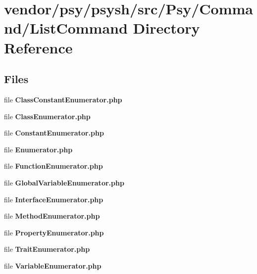 \section{vendor/psy/psysh/src/\+Psy/\+Command/\+List\+Command Directory Reference}
\label{dir_b2f54a0dbabbbaf2cba72a74f0d73e35}
\subsection*{Files}
\begin{DoxyCompactItemize}
\item 
file {\bf Class\+Constant\+Enumerator.\+php}
\item 
file {\bf Class\+Enumerator.\+php}
\item 
file {\bf Constant\+Enumerator.\+php}
\item 
file {\bf Enumerator.\+php}
\item 
file {\bf Function\+Enumerator.\+php}
\item 
file {\bf Global\+Variable\+Enumerator.\+php}
\item 
file {\bf Interface\+Enumerator.\+php}
\item 
file {\bf Method\+Enumerator.\+php}
\item 
file {\bf Property\+Enumerator.\+php}
\item 
file {\bf Trait\+Enumerator.\+php}
\item 
file {\bf Variable\+Enumerator.\+php}
\end{DoxyCompactItemize}
